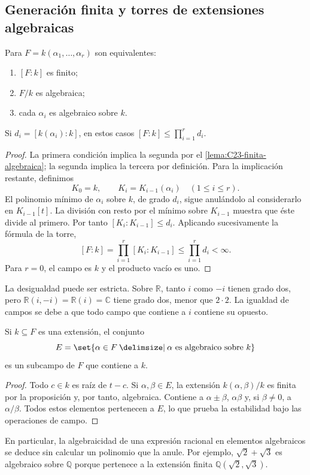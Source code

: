 \subsection{Generación finita y torres de extensiones algebraicas}\label{tema:23-2-2}\label{tema:23-2-3}
\begin{prop}\label{prop:C23-generada-algebraica}
Para $F=k(\alpha_1,\ldots,\alpha_r)$ son equivalentes:
\begin{enumerate}[nosep]
\item $[F:k]$ es finito;
\item $F/k$ es algebraica;
\item cada $\alpha_i$ es algebraico sobre $k$.
\end{enumerate}
Si $d_i=[k(\alpha_i):k]$, en estos casos $[F:k]\leq\prod_{i=1}^r d_i$.
\end{prop}
\begin{proof}
La primera condición implica la segunda por el \cref{lema:C23-finita-algebraica}; la segunda implica la tercera por definición. Para la implicación restante, definimos
\[
K_0=k,\qquad K_i=K_{i-1}(\alpha_i)\quad(1\leq i\leq r).
\]
El polinomio mínimo de $\alpha_i$ sobre $k$, de grado $d_i$, sigue anulándolo al considerarlo en $K_{i-1}[t]$. La división con resto por el mínimo sobre $K_{i-1}$ muestra que éste divide al primero. Por tanto $[K_i:K_{i-1}]\leq d_i$. Aplicando sucesivamente la fórmula de la torre,
\[
[F:k]=\prod_{i=1}^r[K_i:K_{i-1}]\leq\prod_{i=1}^r d_i<\infty.
\]
Para $r=0$, el campo es $k$ y el producto vacío es uno.
\end{proof}

\begin{obs}
La desigualdad puede ser estricta. Sobre $\mathbb R$, tanto $i$ como $-i$ tienen grado dos, pero $\mathbb R(i,-i)=\mathbb R(i)=\mathbb C$ tiene grado dos, menor que $2\cdot2$. La igualdad de campos se debe a que todo campo que contiene a $i$ contiene su opuesto.
\end{obs}

\begin{coro}\label{coro:C23-campo-algebraicos}
Si $k\subseteq F$ es una extensión, el conjunto
\[
E=\set{\alpha\in F\given \alpha\text{ es algebraico sobre }k}
\]
es un subcampo de $F$ que contiene a $k$.
\end{coro}
\begin{proof}
Todo $c\in k$ es raíz de $t-c$. Si $\alpha,\beta\in E$, la extensión $k(\alpha,\beta)/k$ es finita por la proposición y, por tanto, algebraica. Contiene a $\alpha\pm\beta$, $\alpha\beta$ y, si $\beta\ne0$, a $\alpha/\beta$. Todos estos elementos pertenecen a $E$, lo que prueba la estabilidad bajo las operaciones de campo.
\end{proof}
En particular, la algebraicidad de una expresión racional en elementos algebraicos se deduce sin calcular un polinomio que la anule. Por ejemplo, $\sqrt2+\sqrt3$ es algebraico sobre $\mathbb Q$ porque pertenece a la extensión finita $\mathbb Q(\sqrt2,\sqrt3)$.

